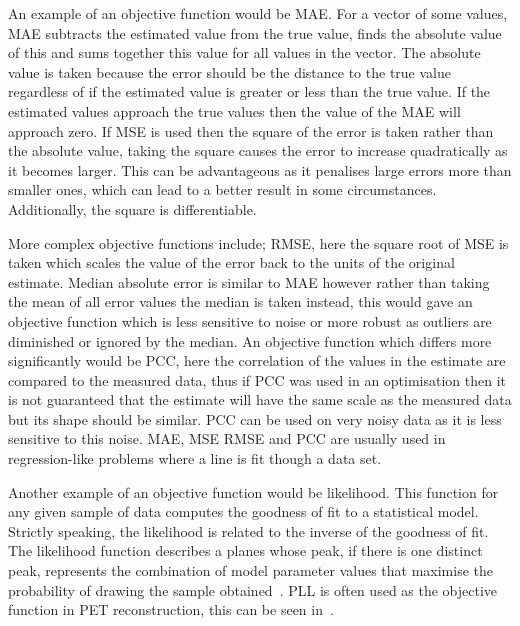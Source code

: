                 An example of an objective function would be \gls{MAE}. For a vector of some values, \gls{MAE} subtracts the estimated value from the true value, finds the absolute value of this and sums together this value for all values in the vector. The absolute value is taken because the error should be the distance to the true value regardless of if the estimated value is greater or less than the true value. If the estimated values approach the true values then the value of the \gls{MAE} will approach zero. If \gls{MSE} is used then the square of the error is taken rather than the absolute value, taking the square causes the error to increase quadratically as it becomes larger. %
                This can be advantageous as it penalises large errors more than smaller ones, which can lead to a better result in some circumstances. Additionally, the square is differentiable.
                
                More complex objective functions include; \gls{RMSE}, here the square root of \gls{MSE} is taken which scales the value of the error back to the units of the original estimate. Median absolute error is similar to \gls{MAE} however rather than taking the mean of all error values the median is taken instead, this would gave an objective function which is less sensitive to noise or more robust as outliers are diminished or ignored by the median. An objective function which differs more significantly would be \gls{PCC}, here the correlation of the values in the estimate are compared to the measured data, thus if \gls{PCC} was used in an optimisation then it is not guaranteed that the estimate will have the same scale as the measured data but its shape should be similar. \gls{PCC} can be used on very noisy data as it is less sensitive to this noise. \gls{MAE}, \gls{MSE} \gls{RMSE} and \gls{PCC} are usually used in regression-like problems where a line is fit though a data set.
                
                Another example of an objective function would be likelihood. This function for any given sample of data computes the goodness of fit to a statistical model. Strictly speaking, the likelihood is related to the inverse of the goodness of fit. 
                The likelihood function describes a planes whose peak, if there is one distinct peak, %
                represents the combination of model parameter values that maximise the probability of drawing the sample obtained~. %
                \gls{PLL} is often used as the objective function in \gls{PET} reconstruction, this can be seen in~.
                
